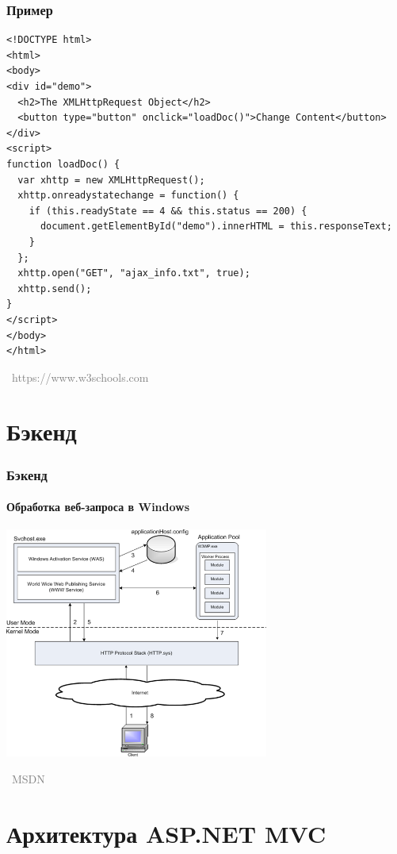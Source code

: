 \documentclass[xetex,mathserif,serif]{beamer}
\newcommand{\attribution}[1] {
\vspace{-5mm}\begin{flushright}\begin{scriptsize}\textcolor{gray}{\textcopyright\, #1}\end{scriptsize}\end{flushright}
}
\begin{document}
    \begin{frame}[fragile]
        \frametitle{Пример}
        \begin{scriptsize}
            \begin{verbatim}
<!DOCTYPE html>
<html>
<body>
<div id="demo">
  <h2>The XMLHttpRequest Object</h2>
  <button type="button" onclick="loadDoc()">Change Content</button>
</div>
<script>
function loadDoc() {
  var xhttp = new XMLHttpRequest();
  xhttp.onreadystatechange = function() {
    if (this.readyState == 4 && this.status == 200) {
      document.getElementById("demo").innerHTML = this.responseText;
    }
  };
  xhttp.open("GET", "ajax_info.txt", true);
  xhttp.send();
}
</script>
</body>
</html>
            \end{verbatim}
        \end{scriptsize}
        \vspace{-3mm}
        \attribution{https://www.w3schools.com}
    \end{frame}

    \section{Бэкенд}

    \begin{frame}
        \frametitle{Бэкенд}
        \framesubtitle{Обработка веб-запроса в Windows}
        \begin{center}
            \includegraphics[width=0.65\textwidth]{requestProcessing.png}
            \vspace{-5mm}
            \attribution{MSDN}
        \end{center}
    \end{frame}

    \section{Архитектура ASP.NET MVC}
\end{document}
